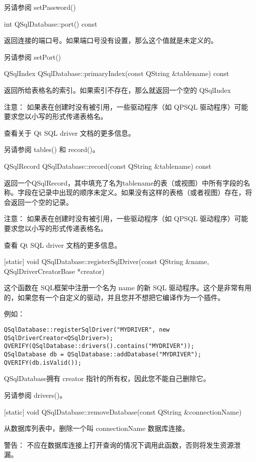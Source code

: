 另请参阅 setPassword()

int QSqlDatabase::port() const


返回连接的端口号。如果端口号没有设置，那么这个值就是未定义的。

另请参阅 setPort()


QSqlIndex QSqlDatabase::primaryIndex(const QString \&tablename) const


返回所给表格名的索引。如果索引不存在，那么就返回一个空的 QSqlIndex

注意： 如果表在创建时没有被引用，一些驱动程序（如 QPSQL 驱动程序）可能要求您以小写的形式传递表格名。

查看关于 Qt SQL driver 文档的更多信息。

另请参阅 tables() 和 record()。

QSqlRecord QSqlDatabase::record(const QString \&tablename) const


返回一个QSqlRecord，其中填充了名为tablename的表（或视图）中所有字段的名称。字段在记录中出现的顺序未定义。如果没有这样的表格（或者视图）存在，将会返回一个空的记录。

注意： 如果表在创建时没有被引用，一些驱动程序（如 QPSQL 驱动程序）可能要求您以小写的形式传递表格名。

查看 Qt SQL driver 文档的更多信息。

[static] void QSqlDatabase::registerSqlDriver(const QString \&name, QSqlDriverCreatorBase *creator)


这个函数在 SQL框架中注册一个名为 name 的新 SQL 驱动程序。这个是非常有用的，如果您有一个自定义的驱动，并且您并不想把它编译作为一个插件。

例如：


\begin{lstlisting}
QSqlDatabase::registerSqlDriver("MYDRIVER", new QSqlDriverCreator<QSqlDriver>);
QVERIFY(QSqlDatabase::drivers().contains("MYDRIVER"));
QSqlDatabase db = QSqlDatabase::addDatabase("MYDRIVER");
QVERIFY(db.isValid());
\end{lstlisting}

QSqlDatabase拥有 creator 指针的所有权，因此您不能自己删除它。

另请参阅 drivers()。

[static] void QSqlDatabase::removeDatabase(const QString \&connectionName)


从数据库列表中，删除一个叫 connectionName 数据库连接。

警告： 不应在数据库连接上打开查询的情况下调用此函数，否则将发生资源泄漏。

\clearpage


